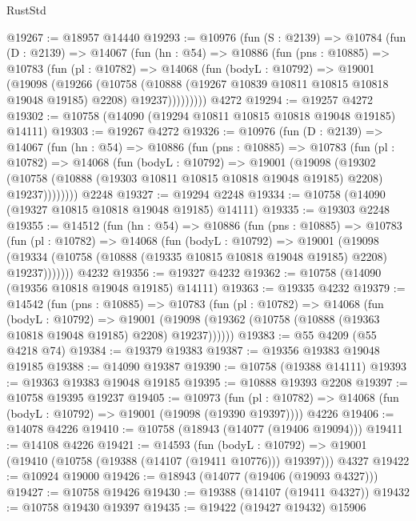 \begin{lexlean}{RustStd}
\begin{coremodule}
@19267 := @18957 @14440
@19293 := @10976
    (fun (S : @2139) =>
    @10784
      (fun (D : @2139) =>
      @14067
        (fun (hn : @54) =>
        @10886
          (fun (pns : @10885) =>
          @10783
            (fun (pl : @10782) =>
            @14068
              (fun (bodyL : @10792) =>
              @19001
                (@19098
                  (@19266
                    (@10758
                      (@10888 (@19267 @10839 @10811 @10815 @10818 @19048 @19185) @2208)
                      @19237)))))))))
    @4272
@19294 := @19257 @4272
@19302 := @10758 (@14090 (@19294 @10811 @10815 @10818 @19048 @19185) @14111)
@19303 := @19267 @4272
@19326 := @10976
    (fun (D : @2139) =>
    @14067
      (fun (hn : @54) =>
      @10886
        (fun (pns : @10885) =>
        @10783
          (fun (pl : @10782) =>
          @14068
            (fun (bodyL : @10792) =>
            @19001
              (@19098
                (@19302
                  (@10758 (@10888 (@19303 @10811 @10815 @10818 @19048 @19185) @2208) @19237))))))))
    @2248
@19327 := @19294 @2248
@19334 := @10758 (@14090 (@19327 @10815 @10818 @19048 @19185) @14111)
@19335 := @19303 @2248
@19355 := @14512
    (fun (hn : @54) =>
    @10886
      (fun (pns : @10885) =>
      @10783
        (fun (pl : @10782) =>
        @14068
          (fun (bodyL : @10792) =>
          @19001
            (@19098
              (@19334 (@10758 (@10888 (@19335 @10815 @10818 @19048 @19185) @2208) @19237)))))))
    @4232
@19356 := @19327 @4232
@19362 := @10758 (@14090 (@19356 @10818 @19048 @19185) @14111)
@19363 := @19335 @4232
@19379 := @14542
    (fun (pns : @10885) =>
    @10783
      (fun (pl : @10782) =>
      @14068
        (fun (bodyL : @10792) =>
        @19001 (@19098 (@19362 (@10758 (@10888 (@19363 @10818 @19048 @19185) @2208) @19237))))))
@19383 := @55 @4209 (@55 @4218 @74)
@19384 := @19379 @19383
@19387 := @19356 @19383 @19048 @19185
@19388 := @14090 @19387
@19390 := @10758 (@19388 @14111)
@19393 := @19363 @19383 @19048 @19185
@19395 := @10888 @19393 @2208
@19397 := @10758 @19395 @19237
@19405 := @10973
    (fun (pl : @10782) => @14068 (fun (bodyL : @10792) => @19001 (@19098 (@19390 @19397))))
    @4226
@19406 := @14078 @4226
@19410 := @10758 (@18943 (@14077 (@19406 @19094)))
@19411 := @14108 @4226
@19421 := @14593
    (fun (bodyL : @10792) => @19001 (@19410 (@10758 (@19388 (@14107 (@19411 @10776))) @19397)))
    @4327
@19422 := @10924 @19000
@19426 := @18943 (@14077 (@19406 (@19093 @4327)))
@19427 := @10758 @19426
@19430 := @19388 (@14107 (@19411 @4327))
@19432 := @10758 @19430 @19397
@19435 := @19422 (@19427 @19432) @15906

\end{coremodule}
\end{lexlean}
